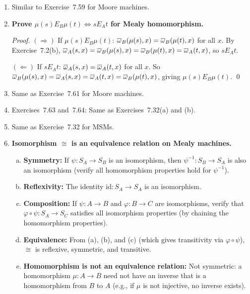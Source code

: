 \begin{enumerate}[{7.}1.]
\item Similar to Exercise~7.59 for Moore machines.

\item \textbf{Prove $\mu(s) E_B \mu(t) \Leftrightarrow s E_A t$ for Mealy homomorphism.}

\begin{proof}
$(\Rightarrow)$ If $\mu(s) E_B \mu(t)$: $\overline{\omega}_B(\mu(s),x)=\overline{\omega}_B(\mu(t),x)$ for all $x$.  By Exercise~7.2(b), $\overline{\omega}_A(s,x)=\overline{\omega}_B(\mu(s),x)=\overline{\omega}_B(\mu(t),x)=\overline{\omega}_A(t,x)$, so $s E_A t$.

$(\Leftarrow)$ If $s E_A t$: $\overline{\omega}_A(s,x)=\overline{\omega}_A(t,x)$ for all $x$.  So $\overline{\omega}_B(\mu(s),x)=\overline{\omega}_A(s,x)=\overline{\omega}_A(t,x)=\overline{\omega}_B(\mu(t),x)$, giving $\mu(s) E_B \mu(t)$. \qed
\end{proof}

\item Same as Exercise~7.61 for Moore machines.

\item Exercises~7.63 and~7.64: Same as Exercises~7.32(a) and (b).

\item Same as Exercise~7.32 for MSMs.

\item \textbf{Isomorphism $\cong$ is an equivalence relation on Mealy machines.}

\begin{enumerate}[(a)]
  \item \textbf{Symmetry:} If $\psi:S_A\to S_B$ is an isomorphism, then $\psi^{-1}:S_B\to S_A$ is also an isomorphism (verify all homomorphism properties hold for $\psi^{-1}$).

  \item \textbf{Reflexivity:} The identity $\text{id}:S_A\to S_A$ is an isomorphism.

  \item \textbf{Composition:} If $\psi:A\to B$ and $\varphi:B\to C$ are isomorphisms, verify that $\varphi\circ\psi:S_A\to S_C$ satisfies all isomorphism properties (by chaining the homomorphism properties).

  \item \textbf{Equivalence:} From (a), (b), and (c) (which gives transitivity via $\varphi\circ\psi$), $\cong$ is reflexive, symmetric, and transitive.

  \item \textbf{Homomorphism is not an equivalence relation:} Not symmetric: a homomorphism $\mu:A\to B$ need not have an inverse that is a homomorphism from $B$ to $A$ (e.g., if $\mu$ is not injective, no inverse exists).
\end{enumerate}


\end{enumerate}
